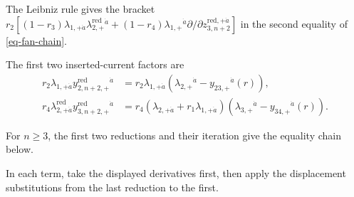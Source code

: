 \documentclass[11pt]{article}
\numberwithin{equation}{section}
\numberwithin{figure}{section}
\numberwithin{table}{section}
\begin{document}
The Leibniz rule gives the bracket $r_2[(1-r_3)\lambda_{1,+\dot a}\lambda_{2,+}^{\mathrm{red}}{}^{\dot a}+(1-r_4)\lambda_{1,+}{}^{\dot a}\partial/\partial z_{3,n+2}^{\mathrm{red},+\dot a}]$ in the second equality of \eqref{eq-fan-chain}.

The first two inserted-current factors are
\begin{equation*}
\begin{aligned}
r_2\lambda_{1,+\dot a}y^{\mathrm{red}}_{2,n+2,+}{}^{\dot a}
&=r_2\lambda_{1,+\dot a}
(\lambda_{2,+}{}^{\dot a}-y_{23,+}{}^{\dot a}(r)),\\
r_4\lambda^{\mathrm{red}}_{2,+\dot a}y^{\mathrm{red}}_{3,n+2,+}{}^{\dot a}
&=r_4(\lambda_{2,+\dot a}+r_1\lambda_{1,+\dot a})
(\lambda_{3,+}{}^{\dot a}-y_{34,+}{}^{\dot a}(r)).
\end{aligned}
\end{equation*}

For $n\ge3$, the first two reductions and their iteration give the equality chain below.

In each term, take the displayed derivatives first, then apply the displacement substitutions from the last reduction to the first.
\end{document}
